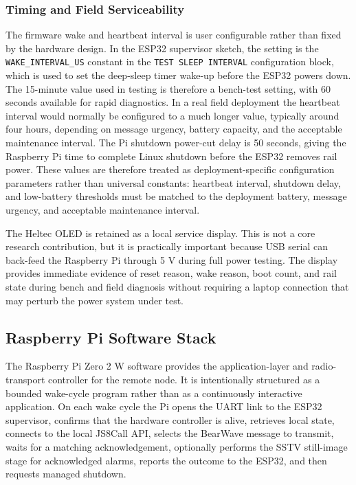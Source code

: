 \documentclass[acmsmall,screen]{acmart}
\begin{document}
\subsubsection{Timing and Field Serviceability}
The firmware wake and heartbeat interval is user configurable rather than fixed by the hardware design. In the ESP32 supervisor sketch, the setting is the \texttt{WAKE\_INTERVAL\_US} constant in the \texttt{TEST SLEEP INTERVAL} configuration block, which is used to set the deep-sleep timer wake-up before the ESP32 powers down. The 15-minute value used in testing is therefore a bench-test setting, with 60 seconds available for rapid diagnostics. In a real field deployment the heartbeat interval would normally be configured to a much longer value, typically around four hours, depending on message urgency, battery capacity, and the acceptable maintenance interval. The Pi shutdown power-cut delay is 50 seconds, giving the Raspberry Pi time to complete Linux shutdown before the ESP32 removes rail power. These values are therefore treated as deployment-specific configuration parameters rather than universal constants: heartbeat interval, shutdown delay, and low-battery thresholds must be matched to the deployment battery, message urgency, and acceptable maintenance interval.

The Heltec OLED is retained as a local service display. This is not a core research contribution, but it is practically important because USB serial can back-feed the Raspberry Pi through 5 V during full power testing. The display provides immediate evidence of reset reason, wake reason, boot count, and rail state during bench and field diagnosis without requiring a laptop connection that may perturb the power system under test.

\subsection{Raspberry Pi Software Stack}
The Raspberry Pi Zero 2 W software provides the application-layer and radio-transport controller for the remote node. It is intentionally structured as a bounded wake-cycle program rather than as a continuously interactive application. On each wake cycle the Pi opens the UART link to the ESP32 supervisor, confirms that the hardware controller is alive, retrieves local state, connects to the local JS8Call API, selects the BearWave message to transmit, waits for a matching acknowledgement, optionally performs the SSTV still-image stage for acknowledged alarms, reports the outcome to the ESP32, and then requests managed shutdown.
\end{document}
